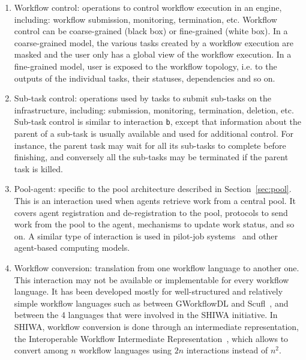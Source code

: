 \documentclass[preprint,3p,twocolumn]{elsarticle}
\begin{document}
\begin{enumerate}[leftmargin=0cm,itemindent=0.65cm,label=\texttt{(\alph*)}]
{    And I clearly see now that this is in fact the case in III, c is not differentiated. Closing this thread for good.}
  Tools and services such as JSAGA~\cite{reynaud2010uniform} or Data Avenue~\cite{hajnal2014data}
  can be used to homogeneize these interfaces.
\item Workflow control: operations to control workflow execution in an
  engine, including: workflow submission, monitoring, termination,
  etc. Workflow control can be coarse-grained (black box) or
  fine-grained (white box). In a coarse-grained model, the various
  tasks created by a workflow execution are masked and the user only
  has a global view of the workflow execution. In a fine-grained
  model, user is exposed to the workflow topology, i.e. to the outputs
  of the individual tasks, their statuses, dependencies and so on.
\item Sub-task control: operations used by tasks to submit sub-tasks
  on the infrastructure, including: submission, monitoring,
  termination, deletion, etc. Sub-task control is similar to
  interaction \texttt{b}, except that information about the parent
  of a sub-task is usually available and used for
  additional control. For instance, the parent task may wait for all
  its sub-tasks to complete before finishing, and conversely all the
  sub-tasks may be terminated if the parent task is killed.
\item Pool-agent: specific to the pool architecture described in
  Section~\ref{sec:pool}. This is an interaction used when agents
  retrieve work from a central pool. It covers agent registration and
  de-registration to the pool, protocols to send work from the pool to
  the agent, mechanisms to update work status, and so on. A similar
  type of interaction is used in pilot-job
  systems~\cite{turilli2015comprehensive} and other agent-based
  computing models.
\item Workflow conversion: translation from one workflow language to
  another one. This interaction may not be available or implementable
  for every workflow language. It has been developed mostly for
  well-structured and relatively simple workflow languages such as between GWorkflowDL
  and Scufl~\cite{OLAB-09}, and between the 4 languages that were involved in the
  SHIWA initiative. In SHIWA, workflow conversion is done through an
  intermediate representation, the Interoperable Workflow Intermediate
  Representation~\cite{plankensteiner-montagnat-etal:2011}, which
  allows to convert among $n$ workflow languages using $2n$
  interactions instead of $n^2$.
\end{enumerate}
\end{document}
